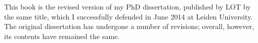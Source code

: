 \begin{refsection}

This book is the revised version of my PhD dissertation, published by LOT by the same title, which I successfully defended in June 2014 at Leiden University. The original dissertation has undergone a number of revisions; overall, however, its contents have remained the same.

\printbibliography[heading=subbibliography]
\end{refsection}

